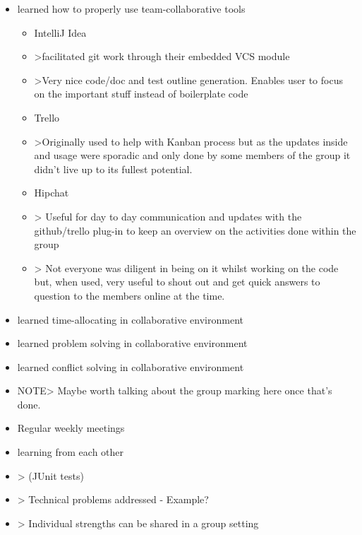 \begin{itemize}
    \item learned how to properly use team-collaborative tools
    \begin{itemize}
            \item IntelliJ Idea
            \item >facilitated git work through their embedded VCS module
            \item >Very nice code/doc and test outline generation. Enables user to focus on the important stuff instead of boilerplate code
            \item Trello
            \item >Originally used to help with Kanban process but as the updates inside and usage were sporadic and only done by some members of the group it didn't live up to its fullest potential.
            \item Hipchat
            \item > Useful for day to day communication and updates with the github/trello plug-in to keep an overview on the activities done within the group
            \item > Not everyone was diligent in being on it whilst working on the code but, when used, very useful to shout out and get quick answers to question to the members online at the time.
     \end{itemize}

    \item learned time-allocating in collaborative environment
    \item learned  problem solving in collaborative environment
    \item learned  conflict solving in collaborative environment
    \item NOTE> Maybe worth talking about the group marking here once that's done.
    \item Regular weekly meetings
    \item learning from each other
    \item > (JUnit tests)
    \item > Technical problems addressed - Example?
    \item > Individual strengths can be shared in a group setting
\end {itemize}

